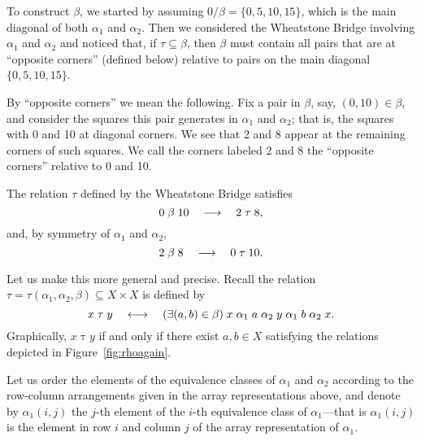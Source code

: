 To construct $\beta$, we started by assuming $0/\beta = \{0,5,10,15\}$,
which is the main diagonal of both $\alpha_1$ and $\alpha_2$.  Then we considered the
Wheatstone Bridge involving $\alpha_1$ and $\alpha_2$ and noticed that, if
$\tau \subseteq \beta$, then $\beta$ must contain all pairs that are at
``opposite corners'' (defined below)
relative to pairs on the main diagonal
$\{0,5,10,15\}$. 


By ``opposite corners'' we mean the following.  Fix a pair in $\beta$, say,
$(0,10)\in \beta$, and consider the squares this pair generates in $\alpha_1$
and $\alpha_2$; that is, the squares with 0 and 10 at diagonal corners. We see
that 2 and 8 appear at the remaining corners of such squares.  We call the
corners labeled 2 and 8 the ``opposite corners'' relative to 0 and 10. 

The relation $\tau$ defined by the Wheatstone Bridge satisfies 
\[
0 \mathrel{\beta} 10 \quad \longrightarrow \quad 2\mathrel{\tau} 8,
\]
and, by symmetry of $\alpha_1$ and $\alpha_2$,
\[
2 \mathrel{\beta} 8 \quad \longrightarrow \quad 0\mathrel{\tau} 10.
\]

Let us make this more general and precise.
Recall the relation $\tau=\tau(\alpha_1, \alpha_2, \beta)\subseteq X\times X$ is
defined by
\begin{equation}
\label{eq:5}  
x \mathrel{\tau} y \quad \longleftrightarrow \quad (\exists (a, b) \in \beta)\;  
x \mathrel{\alpha}_1 a \mathrel{\alpha}_2 y \mathrel{\alpha}_1 b \mathrel{\alpha}_2 x.
\end{equation}
Graphically, $x \mathrel{\tau} y$ if and only if there exist $a, b \in X$
satisfying the relations depicted in Figure~\ref{fig:rhoagain}.  

Let us order the elements of the equivalence classes of $\alpha_1$
and $\alpha_2$ according to the row-column arrangements given in the array
representations above, and
denote by $\alpha_1(i,j)$ the $j$-th element of the $i$-th equivalence class of
$\alpha_1$---that is $\alpha_1(i,j)$ is the element in row $i$ and column $j$ of
the array representation of $\alpha_1$.


